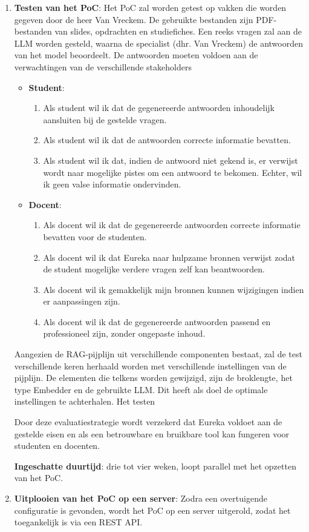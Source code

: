 \begin{enumerate}
    \item \textbf{Testen van het PoC}: Het PoC zal worden getest op vakken die worden gegeven door de heer Van Vreckem. De gebruikte bestanden zijn PDF-bestanden van slides, opdrachten en studiefiches. Een reeks vragen zal aan de LLM worden gesteld, waarna de specialist (dhr. Van Vreckem) de antwoorden van het model beoordeelt. De antwoorden moeten voldoen aan de verwachtingen van de verschillende stakeholders
    
    \begin{itemize} 
        \item \textbf{Student}:
            \begin{enumerate} 
                \item Als student wil ik dat de gegenereerde antwoorden inhoudelijk aansluiten bij de gestelde vragen.
                \item Als student wil ik dat de antwoorden correcte informatie bevatten. 
                \item Als student wil ik dat, indien de antwoord niet gekend is, er verwijst wordt naar mogelijke pistes om een antwoord te bekomen. Echter, wil ik geen valse informatie ondervinden.
            \end{enumerate}
        \item \textbf{Docent}:
            \begin{enumerate} 
                \item Als docent wil ik dat de gegenereerde antwoorden correcte informatie bevatten voor de studenten.
                \item Als docent wil ik dat Eureka naar hulpzame bronnen verwijst zodat de student mogelijke verdere vragen zelf kan beantwoorden. 
                \item Als docent wil ik gemakkelijk mijn bronnen kunnen wijzigingen indien er aanpassingen zijn.
                \item Als docent wil ik dat de gegenereerde antwoorden passend en professioneel zijn, zonder ongepaste inhoud.
            \end{enumerate}    
    \end{itemize}
    
    Aangezien de RAG-pijplijn uit verschillende componenten bestaat, zal de test verschillende keren herhaald worden met verschillende instellingen van de pijplijn. De elementen die telkens worden gewijzigd, zijn de broklengte, het type Embedder en de gebruikte LLM. Dit heeft als doel de optimale instellingen te achterhalen. Het testen
    
    Door deze evaluatiestrategie wordt verzekerd dat Eureka voldoet aan de gestelde eisen en als een betrouwbare en bruikbare tool kan fungeren voor studenten en docenten.
    
    \textbf{Ingeschatte duurtijd}: drie tot vier weken, loopt parallel met het opzetten van het PoC.
    
    \item \textbf{Uitplooien van het PoC op een server}: Zodra een overtuigende configuratie is gevonden, wordt het PoC op een server uitgerold, zodat het toegankelijk is via een REST API.
\end{enumerate}


